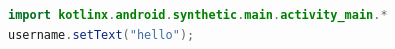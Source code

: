 %

\begin{lstlisting}[language=java,caption={Esempio Kotlin Android Extensions}]
import kotlinx.android.synthetic.main.activity_main.*
username.setText("hello");
\end{lstlisting}

\clearpage{\pagestyle{empty}\cleardoublepage}
